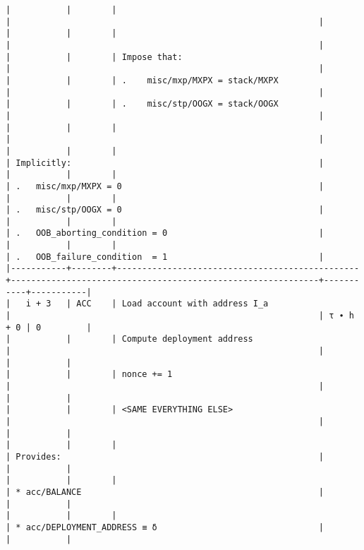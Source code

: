 \documentclass[varwidth=\maxdimen,margin=0.5cm,multi={verbatim}]{standalone}
\begin{document}
\begin{verbatim}
|           |        |                                                |                                                             |
|           |        |                                                |                                                             |
|           |        | Impose that:                                   |                                                             |
|           |        | .    misc/mxp/MXPX = stack/MXPX                |                                                             |
|           |        | .    misc/stp/OOGX = stack/OOGX                |                                                             |
|           |        |                                                |                                                             |
|           |        |                                                | Implicitly:                                                 |
|           |        |                                                | .   misc/mxp/MXPX = 0                                       |
|           |        |                                                | .   misc/stp/OOGX = 0                                       |
|           |        |                                                | .   OOB_aborting_condition = 0                              |
|           |        |                                                | .   OOB_failure_condition  = 1                              |
|-----------+--------+------------------------------------------------+-------------------------------------------------------------+-----------+-----------|
|   i + 3   | ACC    | Load account with address I_a                  |                                                             | τ ∙ h + 0 | 0         |
|           |        | Compute deployment address                     |                                                             |           |           |
|           |        | nonce += 1                                     |                                                             |           |           |
|           |        | <SAME EVERYTHING ELSE>                         |                                                             |           |           |
|           |        |                                                | Provides:                                                   |           |           |
|           |        |                                                | * acc/BALANCE                                               |           |           |
|           |        |                                                | * acc/DEPLOYMENT_ADDRESS ≡ δ                                |           |           |

\end{verbatim}
\end{document}

